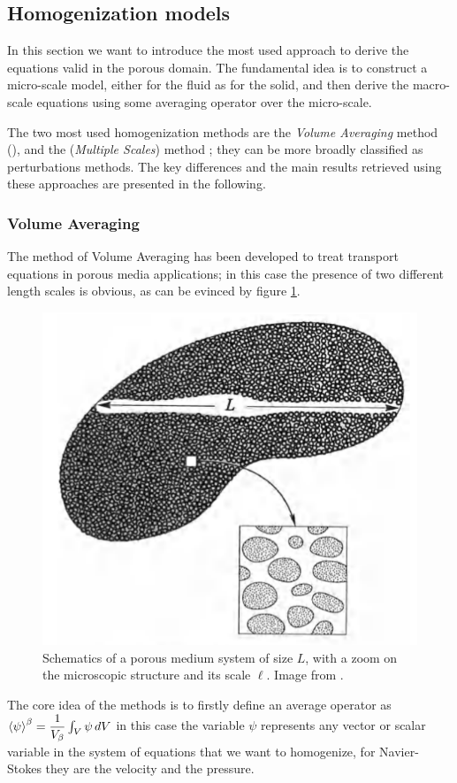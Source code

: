 \subsection{Homogenization models}

In this section we want to introduce the most used approach to derive the equations valid in the porous domain.
The fundamental idea is to construct a micro-scale model, either for the fluid as for the solid, and then derive the macro-scale equations using some averaging operator over the micro-scale.

The two most used homogenization methods are the \textit{Volume Averaging} method (\citet{whitaker2013method}), and the (\textit{Multiple Scales}) method \citet{mei2010homogenization}; they can be more broadly classified as perturbations methods. 
The key differences and the main results retrieved using these approaches are presented in the following.


\subsubsection{Volume Averaging}
\label{sec:vans}

The method of Volume Averaging has been developed to treat transport equations in porous media applications; in this case the presence of two different length scales is obvious, as can be evinced by figure \ref{fig:porsystem}.
	
	\begin{figure}[h]
		\centering
		\includegraphics[width=0.5\linewidth]{chapter_1/por_system}
		\caption{Schematics of a porous medium system of size $L$, with a zoom on the microscopic structure and its scale $\ell$. Image from \citet{whitaker2013method}.}
		\label{fig:porsystem}
	\end{figure}

The core idea of the methods is to firstly define an average operator as ${\left< \psi \right>}^{\beta} = \dfrac{1}{V_\beta} \int_{V} \psi \, dV$ in this case the variable $\psi$ represents any vector or scalar variable in the system of equations that we want to homogenize, for Navier-Stokes they are the velocity and the pressure.

